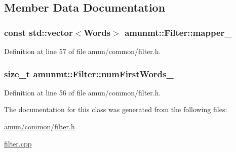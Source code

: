 \subsection{Member Data Documentation}
\subsubsection[{\texorpdfstring{mapper\+\_\+}{mapper_}}]{\setlength{\rightskip}{0pt plus 5cm}const std\+::vector$<${\bf Words}$>$ amunmt\+::\+Filter\+::mapper\+\_\+\hspace{0.3cm}{\ttfamily [private]}}\hypertarget{classamunmt_1_1Filter_a52d077db831125a814563951868d3e16}{}\label{classamunmt_1_1Filter_a52d077db831125a814563951868d3e16}


Definition at line 57 of file amun/common/filter.\+h.

\subsubsection[{\texorpdfstring{num\+First\+Words\+\_\+}{numFirstWords_}}]{\setlength{\rightskip}{0pt plus 5cm}size\+\_\+t amunmt\+::\+Filter\+::num\+First\+Words\+\_\+\hspace{0.3cm}{\ttfamily [private]}}\hypertarget{classamunmt_1_1Filter_a1c4086583ea962edbfc4d9d6e9291424}{}\label{classamunmt_1_1Filter_a1c4086583ea962edbfc4d9d6e9291424}


Definition at line 56 of file amun/common/filter.\+h.



The documentation for this class was generated from the following files\+:\begin{DoxyCompactItemize}
\item 
\hyperlink{amun_2common_2filter_8h}{amun/common/filter.\+h}\item 
\hyperlink{filter_8cpp}{filter.\+cpp}\end{DoxyCompactItemize}
